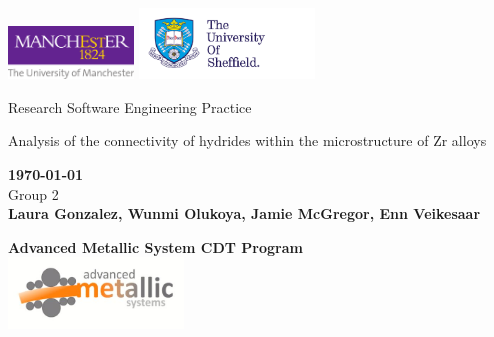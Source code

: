 \documentclass[12pt]{article}
\begin{document}
\onehalfspacing
\thispagestyle{empty} 
\begin{titlepage}
    \centering
    \includegraphics[width=0.25\textwidth]{uom_logo.pdf}
    \hspace{170}
    \includegraphics[width=0.35\textwidth]{Sheffield.pdf}
    \begin{center}
       \vspace*{4cm}
       {\LARGE Research Software Engineering Practice}
       \vspace{3cm}
    \begin{large}   
    

         
         \vspace{0.5cm}

        {\LARGE Analysis of the connectivity of hydrides within the microstructure of Zr alloys} \\

       \vspace{1.5cm}
        
        {\bf \today} \\
                
        
       \vspace{3 cm}
        Group 2 \\
       \textbf{Laura Gonzalez,
       Wunmi Olukoya,
       Jamie McGregor, 
       Enn Veikesaar }\\

       \vfill
       \centering
       
        {\bf \large Advanced Metallic System CDT Program}\\
          
        \includegraphics[width=0.35\textwidth]{CDT.jpg}
        
    
    
    \end{large}  
   \end{center}
\end{titlepage}
\newpage 
\thispagestyle{plain} 
\end{document}
